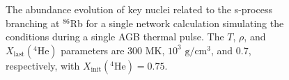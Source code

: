 \begin{figure}[t]
\centering
{}
\caption{\label{fig:abund_evol}The abundance evolution of key nuclei related to the s-process branching at $^{86}$Rb for a single network calculation simulating the conditions during a single AGB thermal pulse. The $T$, $\rho$, and $X_{\mathrm{last}}(^{4}\mathrm{He})$ parameters are 300 MK, $10^{3}$ $\mathrm{g}/\mathrm{cm}^{3}$, and 0.7, respectively, with $X_{\mathrm{init}}(^{4}\mathrm{He}) = 0.75$.}
\end{figure}

